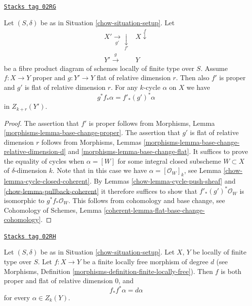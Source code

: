 \begin{lemma}
\label{chow-lemma-flat-pullback-proper-pushforward}
\href{https://stacks.math.columbia.edu/tag/02RG}{\texttt{Stacks tag 02RG}}

Let $(S, \delta)$ be as in Situation \ref{chow-situation-setup}.
Let
$$
\begin{array}{cc}X' \underset{g'}{\longrightarrow}\underset{f'}{\downarrow} & X \overset{f}{\downarrow} \\ Y' \overset{g}{\longrightarrow} & Y\end{array}
$$
be a fibre product diagram of schemes locally of finite type over $S$.
Assume $f : X \to Y$ proper and $g : Y' \to Y$ flat of relative dimension $r$.
Then also $f'$ is proper and $g'$ is flat of relative dimension $r$.
For any $k$-cycle $\alpha$ on $X$ we have
$$
g^*f_*\alpha = f'_*(g')^*\alpha
$$
in $Z_{k + r}(Y')$.
\end{lemma}

\begin{proof}

The assertion that $f'$ is proper follows from
Morphisms, Lemma \ref{morphisms-lemma-base-change-proper}.
The assertion that $g'$ is flat of relative dimension $r$ follows from
Morphisms, Lemmas \ref{morphisms-lemma-base-change-relative-dimension-d}
and \ref{morphisms-lemma-base-change-flat}.
It suffices to prove the equality of cycles when $\alpha = [W]$
for some integral closed subscheme $W \subset X$ of $\delta$-dimension $k$.
Note that in this case we have $\alpha = [\mathcal{O}_W]_k$, see
Lemma \ref{chow-lemma-cycle-closed-coherent}.
By Lemmas \ref{chow-lemma-cycle-push-sheaf} and
\ref{chow-lemma-pullback-coherent} it therefore suffices
to show that $f'_*(g')^*\mathcal{O}_W$ is isomorphic to
$g^*f_*\mathcal{O}_W$. This follows from cohomology and
base change, see
Cohomology of Schemes, Lemma \ref{coherent-lemma-flat-base-change-cohomology}.
\end{proof}

\begin{lemma}
\label{chow-lemma-finite-flat}
\href{https://stacks.math.columbia.edu/tag/02RH}{\texttt{Stacks tag 02RH}}

Let $(S, \delta)$ be as in Situation \ref{chow-situation-setup}.
Let $X$, $Y$ be locally of finite type over $S$.
Let $f : X \to Y$ be a finite locally free morphism
of degree $d$ (see
Morphisms, Definition \ref{morphisms-definition-finite-locally-free}).
Then $f$ is both proper and flat of relative dimension $0$, and
$$
f_*f^*\alpha = d\alpha
$$
for every $\alpha \in Z_k(Y)$.
\end{lemma}

